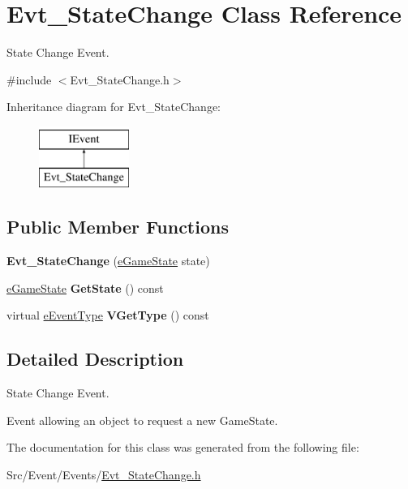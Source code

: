 \hypertarget{classEvt__StateChange}{\section{Evt\-\_\-\-State\-Change Class Reference}
\label{classEvt__StateChange}
}


State Change Event.  




{\ttfamily \#include $<$Evt\-\_\-\-State\-Change.\-h$>$}

Inheritance diagram for Evt\-\_\-\-State\-Change\-:\begin{figure}[H]
\begin{center}
\leavevmode
\includegraphics[height=2.000000cm]{classEvt__StateChange}
\end{center}
\end{figure}
\subsection*{Public Member Functions}
\begin{DoxyCompactItemize}
\item 
\hypertarget{classEvt__StateChange_aa07f85ce9817d01be2efd8e1b80dfe20}{{\bfseries Evt\-\_\-\-State\-Change} (\hyperlink{BaseGameState_8h_ae12dcfc1b1e01980b11e116e3af6807f}{e\-Game\-State} state)}\label{classEvt__StateChange_aa07f85ce9817d01be2efd8e1b80dfe20}

\item 
\hypertarget{classEvt__StateChange_a64852503665c31c7e4e2a592c94fc3a8}{\hyperlink{BaseGameState_8h_ae12dcfc1b1e01980b11e116e3af6807f}{e\-Game\-State} {\bfseries Get\-State} () const }\label{classEvt__StateChange_a64852503665c31c7e4e2a592c94fc3a8}

\item 
\hypertarget{classEvt__StateChange_a386e432311ca3da22adf21101259b4a0}{virtual \hyperlink{IEvent_8h_a052e637824ed8cb8a5e9d5d73b5b3c8b}{e\-Event\-Type} {\bfseries V\-Get\-Type} () const }\label{classEvt__StateChange_a386e432311ca3da22adf21101259b4a0}

\end{DoxyCompactItemize}


\subsection{Detailed Description}
State Change Event. 

Event allowing an object to request a new Game\-State. 

The documentation for this class was generated from the following file\-:\begin{DoxyCompactItemize}
\item 
Src/\-Event/\-Events/\hyperlink{Evt__StateChange_8h}{Evt\-\_\-\-State\-Change.\-h}\end{DoxyCompactItemize}
